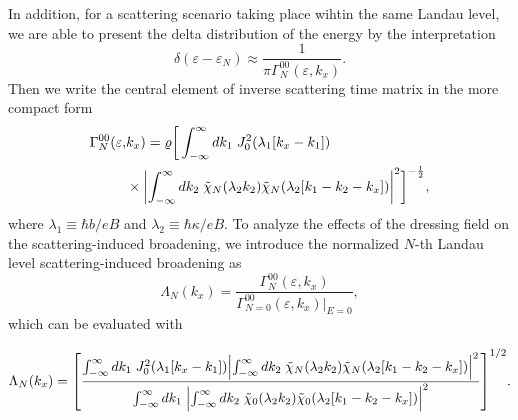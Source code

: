 In addition, for a scattering scenario taking place wihtin the same Landau level, we are able to present the delta distribution of the energy by the  interpretation \cite{dini16}
\begin{equation} \label{eq_16}
 \delta(\varepsilon - \varepsilon_{N}) \approx
 \frac{1}{\pi \Gamma^{00}_{N}(\varepsilon,k_x)}.
\end{equation}
Then we write the central element of inverse scattering time matrix in the more compact form
\begin{equation} \label{eq_17}
  \begin{aligned}
    \Gamma^{00}_{N}(\varepsilon,& k_x) =
    \varrho
    \bigg[
    \int_{-\infty}^{\infty} d {k}_1 \;
    J_0^2\qty(\lambda_1[{k}_x - {k}_1]) \\
    & \times
    \qty|
    \int_{-\infty}^{\infty} d{k}_2 \;
    \tilde{\chi}_{N}\qty(\lambda_2 k_2)
    \tilde{\chi}_{N}\qty(\lambda_2 \qty[{k}_1 - {k}_2 - {k}_x])|^2
    \bigg]^{-\frac{1}{2}},
  \end{aligned}
\end{equation}
where $ \lambda_1 \equiv \hbar b/eB$ and  $\lambda_2 \equiv \hbar \kappa/eB$.
To analyze the effects of the dressing field on the scattering-induced broadening, we introduce the normalized $N$-th Landau level scattering-induced broadening as
\begin{equation} \label{eq_18}
    \Lambda_N(k_x) =
    \frac{\Gamma^{00}_{N}(\varepsilon,k_x)}{\Gamma^{00}_{N=0}(\varepsilon,k_x)\big|_{E=0}},
\end{equation}
which can be evaluated with
\begin{widetext}
\begin{equation} \label{eq_19}
    \Lambda_N (k_x) =
    \qty[
    \frac
    {\int_{-\infty}^{\infty} d {k}_1 \;
    J_0^2\qty(\lambda_1[{k}_x - {k}_1])
    \qty|
    \int_{-\infty}^{\infty} d{k}_2 \;
    \tilde{\chi}_{N}\qty(\lambda_2 k_2)
    \tilde{\chi}_{N}\qty(\lambda_2 \qty[{k}_1 - {k}_2 - {k}_x])|^2}
    {\int_{-\infty}^{\infty} d {k}_1 \;
    \qty|
    \int_{-\infty}^{\infty} d{k}_2 \;
    \tilde{\chi}_{0}\qty(\lambda_2 k_2)
    \tilde{\chi}_{0}\qty(\lambda_2 \qty[{k}_1 - {k}_2 - {k}_x])|^2}
    ]^{1/2}.
\end{equation}
\end{widetext}

